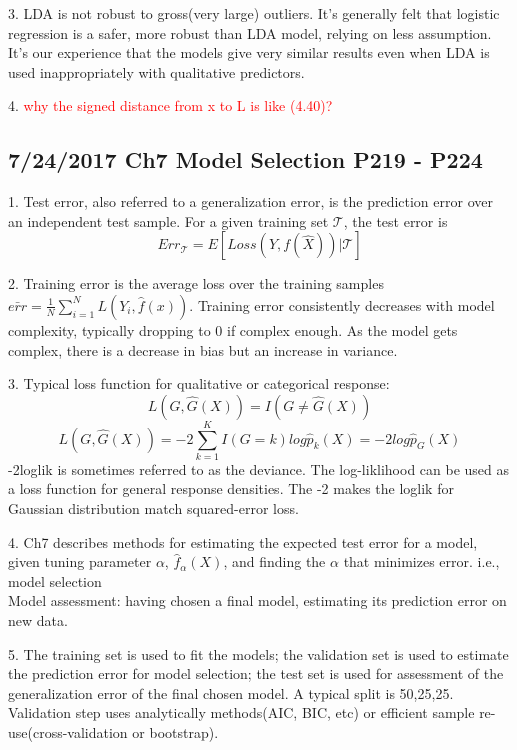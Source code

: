 \documentclass[a4paper, 12pt]{article}
\begin{document}
3. LDA is not robust to gross(very large) outliers. It's generally felt that logistic regression is a safer, more robust than LDA model, relying on less assumption. It's our experience that the models give very similar results even when LDA is used inappropriately with qualitative predictors.

4. \textcolor{red}{why the signed distance from x to L is like (4.40)?}

\subsection*{7/24/2017 Ch7 Model Selection P219 - P224} 
1. Test error, also referred to a generalization error, is the prediction error over an independent test sample. For a given training set $\mathcal{T}$, the test error is 
$$Err_\mathcal{T}=E[Loss(Y,f(\hat{X}))|\mathcal{T}]$$

2. Training error is the average loss over the training samples $\bar{err}=\frac{1}{N}\sum_{i=1}^{N}L(Y_i, \hat{f}(x))$. Training error consistently decreases with model complexity, typically dropping to 0 if complex enough. As the model gets complex, there is a decrease in bias but an increase in variance.

3. Typical loss function for qualitative or categorical response:
$$L(G,\hat{G}(X))=I(G\ne \hat{G}(X))$$
$$L(G,\hat{G}(X))=-2\sum_{k=1}^{K}I(G=k)log\hat{p}_k(X)=-2log\hat{p}_G(X)$$
-2loglik is sometimes referred to as the deviance. The log-liklihood can be used as a loss function for general response densities. The -2 makes the loglik for Gaussian distribution match squared-error loss.

4. Ch7 describes methods for estimating the expected test error for a model, given tuning parameter $\alpha$, $\hat{f}_{\alpha}(X)$, and finding the $\alpha$ that minimizes error. i.e., model selection\\
Model assessment: having chosen a final model, estimating its prediction error on new data.

5. The training set is used to fit the models; the validation set is used to estimate the prediction error for model selection; the test set is used for assessment of the generalization error of the final chosen model. A typical split is 50,25,25. Validation step uses analytically methods(AIC, BIC, etc) or efficient sample re-use(cross-validation or bootstrap).
\end{document}
